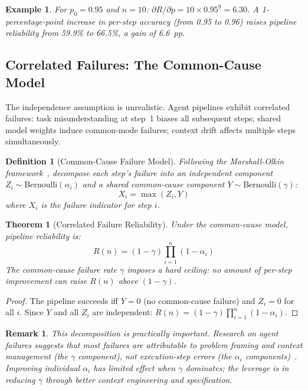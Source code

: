 \documentclass[11pt, a4paper, logo, copyright]{googledeepmind}
\newtheorem{definition}{Definition}[section]
\newtheorem{theorem}{Theorem}[section]
\newtheorem*{remark}{Remark}
\newtheorem{example}{Example}[section]
\begin{document}
\begin{example}
For $p_0 = 0.95$ and $n = 10$: $\partial R/\partial p = 10 \times 0.95^9 = 6.30$.
A 1-percentage-point increase in per-step accuracy (from 0.95 to 0.96) raises pipeline reliability from 59.9\% to 66.5\%, a gain of 6.6~pp.
\end{example}

\subsection{Correlated Failures: The Common-Cause Model}

The independence assumption is unrealistic.
Agent pipelines exhibit correlated failures: task misunderstanding at step~1 biases all subsequent steps; shared model weights induce common-mode failures; context drift affects multiple steps simultaneously.

\begin{definition}[Common-Cause Failure Model]
\label{def:commoncause}
Following the Marshall-Olkin framework~\citep{marshall1967multivariate}, decompose each step's failure into an independent component $Z_i \sim \text{Bernoulli}(\alpha_i)$ and a shared common-cause component $Y \sim \text{Bernoulli}(\gamma)$:
\begin{equation}
X_i = \max(Z_i, Y)
\end{equation}
where $X_i$ is the failure indicator for step $i$.
\end{definition}

\begin{theorem}[Correlated Failure Reliability]
\label{thm:correlated}
Under the common-cause model, pipeline reliability is:
\begin{equation}
R(n) = (1 - \gamma) \prod_{i=1}^{n} (1 - \alpha_i)
\end{equation}
The common-cause failure rate $\gamma$ imposes a hard ceiling: no amount of per-step improvement can raise $R(n)$ above $(1 - \gamma)$.
\end{theorem}

\begin{proof}
The pipeline succeeds iff $Y = 0$ (no common-cause failure) and $Z_i = 0$ for all $i$.
Since $Y$ and all $Z_i$ are independent: $R(n) = (1-\gamma)\prod_{i=1}^{n}(1-\alpha_i)$.
\end{proof}

\begin{remark}
This decomposition is practically important.
Research on agent failures suggests that most failures are attributable to problem framing and context management (the $\gamma$ component), not execution-step errors (the $\alpha_i$ components)~\citep{cemri2025multiagent}.
Improving individual $\alpha_i$ has limited effect when $\gamma$ dominates; the leverage is in reducing $\gamma$ through better context engineering and specification.
\end{remark}
\end{document}
